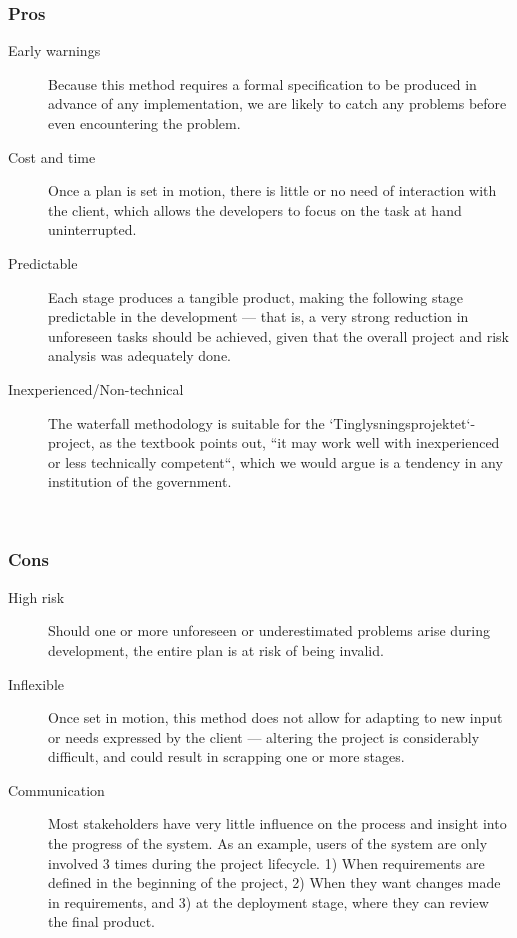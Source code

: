 \documentclass[11pt]{article}
\newcommand{\colbreak}{\vfill{\ }\columnbreak}
\begin{document}
\begin{multicols}{2}
    \subsubsection{Pros}
    \begin{description}
        \item[Early warnings] Because this method requires a formal specification to be produced in advance of any implementation, we are likely to catch any problems before even encountering the problem.
        \item[Cost and time] Once a plan is set in motion, there is little or no need of interaction with the client, which allows the developers to focus on the task at hand uninterrupted.
        \item[Predictable] Each stage produces a tangible product, making the following stage predictable in the development --- that is, a very strong reduction in unforeseen tasks should be achieved, given that the overall project and risk analysis was adequately done.
        \item[Inexperienced/Non-technical] The waterfall methodology is suitable for the `Tinglysningsprojektet`-project, as the textbook points out, ``it may work well with inexperienced or less technically competent``, which we would argue is a tendency in any institution of the government.
    \end{description}
    \colbreak
    
    \subsubsection{Cons}
    \begin{description}
        \item[High risk] Should one or more unforeseen or underestimated problems arise during development, the entire plan is at risk of being invalid.
        \item[Inflexible] Once set in motion, this method does not allow for adapting to new input or needs expressed by the client --- altering the project is considerably difficult, and could result in scrapping one or more stages.
        \item[Communication] Most stakeholders have very little influence%
        on the process and insight into the progress of the system. 
        As an example, users of the system are only involved 3 times during the project lifecycle. 1) When requirements are defined in the beginning of the project, 2) When they want changes made in requirements, and 3) at the deployment stage, where they can review the final product.
    \end{description}
\end{multicols}
\end{document}
